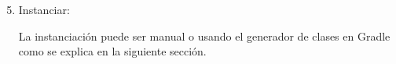 			

\begin{enumerate}
  \setcounter{enumi}{4}
	\item Instanciar:

	La instanciación puede ser manual o usando el generador de clases en Gradle como se explica en la siguiente sección.

\end{enumerate}	





